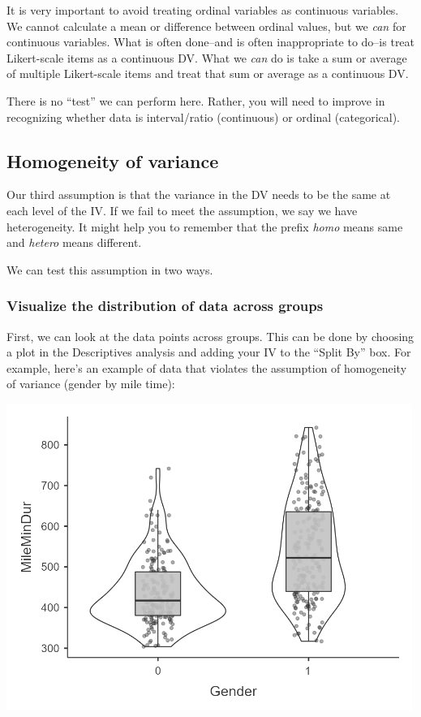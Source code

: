 \documentclass[
]{book}
\begin{document}
It is very important to avoid treating ordinal variables as continuous variables. We cannot calculate a mean or difference between ordinal values, but we \emph{can} for continuous variables. What is often done--and is often inappropriate to do--is treat Likert-scale items as a continuous DV. What we \emph{can} do is take a sum or average of multiple Likert-scale items and treat that sum or average as a continuous DV.

There is no ``test'' we can perform here. Rather, you will need to improve in recognizing whether data is interval/ratio (continuous) or ordinal (categorical).

\hypertarget{homogeneity-of-variance}{%
\subsection{Homogeneity of variance}\label{homogeneity-of-variance}}

Our third assumption is that the variance in the DV needs to be the same at each level of the IV. If we fail to meet the assumption, we say we have heterogeneity. It might help you to remember that the prefix \emph{homo} means same and \emph{hetero} means different.

We can test this assumption in two ways.

\hypertarget{visualize-the-distribution-of-data-across-groups}{%
\subsubsection{Visualize the distribution of data across groups}\label{visualize-the-distribution-of-data-across-groups}}

First, we can look at the data points across groups. This can be done by choosing a plot in the Descriptives analysis and adding your IV to the ``Split By'' box. For example, here's an example of data that violates the assumption of homogeneity of variance (gender by mile time):

\includegraphics[width=5.20833in,height=\textheight]{images/06-inferential/homogeneity.png}
\end{document}
